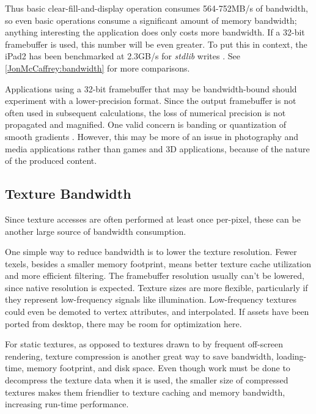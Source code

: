 
 Thus basic clear-fill-and-display operation consumes 564-752MB/s of bandwidth, so
even basic operations consume a significant amount of memory bandwidth;
anything interesting the application does only costs more bandwidth. If a
32-bit framebuffer is used, this number will be even greater.  To put this in
context, the iPad2 has been benchmarked at 2.3GB/s for \textit{stdlib} writes
\cite{Shimpi11}  .  See \ref{JonMcCaffrey:bandwidth} for more comparisons.


Applications using a 32-bit framebuffer that may be bandwidth-bound should
experiment with a lower-precision format.  Since the output framebuffer is not
often used in subsequent calculations, the loss of numerical precision is not
propagated and magnified.  One valid concern is banding or quantization of
smooth gradients \cite{Guy10}.  However, this may be more of an issue in
photography and media applications rather than games and 3D applications,
because of the nature of the produced content.

\subsection{Texture Bandwidth}\label{JonMcCaffrey-Texture-Bandwidth} Since
texture accesses are often performed at least once per-pixel, these can be
another large source of bandwidth consumption.


One simple way to reduce bandwidth is to lower the texture resolution.  Fewer
texels, besides a smaller memory footprint, means better texture cache
utilization and more efficient filtering.  The framebuffer resolution usually
can't be lowered, since native resolution is expected.  Texture sizes are more
flexible, particularly if they represent low-frequency signals like
illumination.  Low-frequency textures could even be demoted to vertex
attributes, and interpolated.  If assets have been ported from desktop, there
may be room for optimization here.


For static textures, as opposed to textures drawn to by frequent off-screen
rendering, texture compression is another great way to save bandwidth,
loading-time, memory footprint, and disk space.  Even though work must be done
to decompress the texture data when it is used, the smaller size of compressed
textures makes them friendlier to texture caching and memory bandwidth,
increasing run-time performance. 

